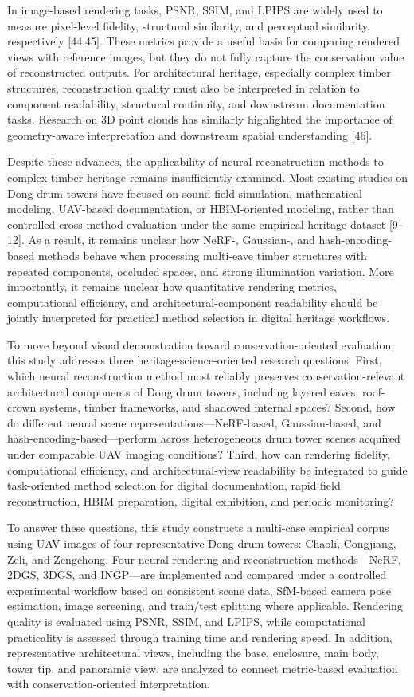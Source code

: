 In image-based rendering tasks, PSNR, SSIM, and LPIPS are widely used to
measure pixel-level fidelity, structural similarity, and perceptual
similarity, respectively [44,45]. These metrics provide a useful
basis for comparing rendered views with reference images, but they do
not fully capture the conservation value of reconstructed outputs. For
architectural heritage, especially complex timber structures,
reconstruction quality must also be interpreted in relation to component
readability, structural continuity, and downstream documentation tasks.
Research on 3D point clouds has similarly highlighted the importance of
geometry-aware interpretation and downstream spatial understanding
[46].

Despite these advances, the applicability of neural reconstruction
methods to complex timber heritage remains insufficiently examined. Most
existing studies on Dong drum towers have focused on sound-field
simulation, mathematical modeling, UAV-based documentation, or
HBIM-oriented modeling, rather than controlled cross-method evaluation
under the same empirical heritage dataset [9--12]. As a result, it
remains unclear how NeRF-, Gaussian-, and hash-encoding-based methods
behave when processing multi-eave timber structures with repeated
components, occluded spaces, and strong illumination variation. More
importantly, it remains unclear how quantitative rendering metrics,
computational efficiency, and architectural-component readability should
be jointly interpreted for practical method selection in digital
heritage workflows.

To move beyond visual demonstration toward conservation-oriented
evaluation, this study addresses three heritage-science-oriented
research questions. First, which neural reconstruction method most
reliably preserves conservation-relevant architectural components of
Dong drum towers, including layered eaves, roof-crown systems, timber
frameworks, and shadowed internal spaces? Second, how do different
neural scene representations---NeRF-based, Gaussian-based, and
hash-encoding-based---perform across heterogeneous drum tower scenes
acquired under comparable UAV imaging conditions? Third, how can
rendering fidelity, computational efficiency, and architectural-view
readability be integrated to guide task-oriented method selection for
digital documentation, rapid field reconstruction, HBIM preparation,
digital exhibition, and periodic monitoring?

To answer these questions, this study constructs a multi-case empirical
corpus using UAV images of four representative Dong drum towers: Chaoli,
Congjiang, Zeli, and Zengchong. Four neural rendering and reconstruction
methods---NeRF, 2DGS, 3DGS, and INGP---are implemented and compared
under a controlled experimental workflow based on consistent scene data,
SfM-based camera pose estimation, image screening, and train/test
splitting where applicable. Rendering quality is evaluated using PSNR,
SSIM, and LPIPS, while computational practicality is assessed through
training time and rendering speed. In addition, representative
architectural views, including the base, enclosure, main body, tower
tip, and panoramic view, are analyzed to connect metric-based evaluation
with conservation-oriented interpretation.

